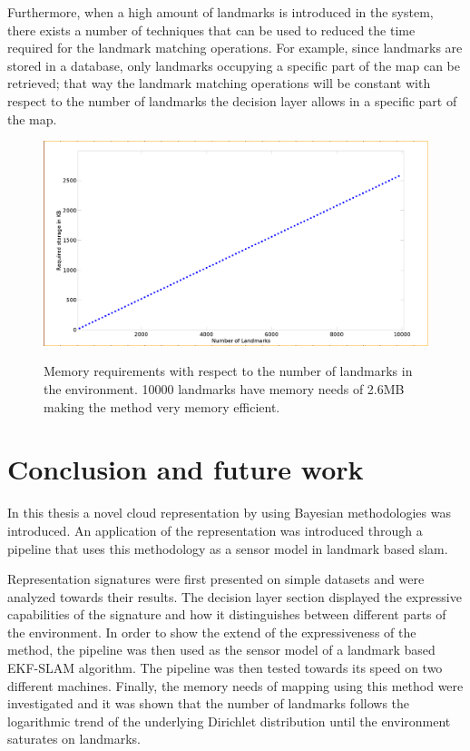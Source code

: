\documentclass [twoside,hidelinks]{article}
\begin{document}
Furthermore, when a high amount of  landmarks is introduced in the system, there exists a number of techniques that can be used to reduced the time required for the landmark matching operations.
For example, since landmarks are stored in a database, only landmarks occupying a specific part of the map can be retrieved;
that way the landmark matching operations will be constant with respect to the number of landmarks the decision layer allows in a specific part of the map. 

\begin{figure} [!ht]
  \centering
  \includegraphics [width=.8\textwidth]{MemoryRequirements} \\
  \caption{Memory requirements with respect to the number of landmarks in the environment. 10000 landmarks have memory needs of 2.6MB making the method very memory efficient.}
  \label{pip:reqs}
\end{figure}


\newpage
\section{Conclusion and future work}
\label{sec:conclusion}

In this thesis a novel cloud representation by using Bayesian methodologies was introduced.
An application of the representation was introduced through a pipeline that uses this methodology as a sensor model in landmark based slam. 

Representation signatures were first presented on simple datasets and were analyzed towards their results. 
The decision layer section displayed the expressive capabilities of the signature and how it distinguishes between different parts of the environment.
In order to show the extend of the expressiveness of the method, the pipeline was then used as the sensor model of a landmark based EKF-SLAM algorithm.
The pipeline was then tested towards its speed on two different machines.
Finally, the memory needs of mapping using this method were investigated and it was shown that the number of landmarks follows the logarithmic trend of the underlying Dirichlet distribution until the environment saturates on landmarks.
\end{document}
